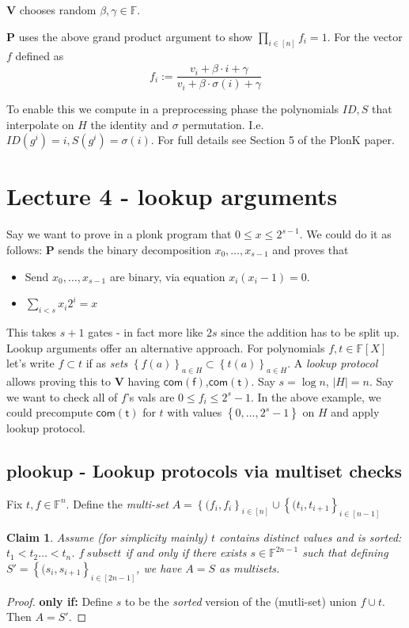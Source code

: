 \documentclass[11pt]{article} %
\newcommand{\F}{\ensuremath{\mathbb F}\xspace}
\newcommand{\com}[1]{\ensuremath{\mathsf{com(#1)}}\xspace}
\newcommand{\defeq}{:=}
\newcommand{\sett}[2]{\ensuremath{\set{#1}_{#2}}\xspace}
\newcommand{\prv}{\ensuremath{\mathsf{\mathbf{P}}}\xspace}
\newcommand{\ver}{\ensuremath{\mathsf{\mathbf{V}}}\xspace}
\newcommand{\set}[1]{\ensuremath{\left\{#1\right\}}\xspace}
\newcommand{\polys}{\ensuremath{\F[X]}\xspace}
\newtheorem{claim}[lemma]{Claim}
\begin{document}
\ver chooses random $\beta,\gamma\in \F$.

\prv uses the above grand product argument to show $\prod_{i\in [n]} f_i =1$.
For the vector $f$ defined as
\[f_i \defeq \frac{v_i + \beta \cdot i +\gamma}{v_i + \beta \cdot \sigma(i) +\gamma}\]

To enable this we compute in a preprocessing phase the polynomials $ID,S$ that interpolate on $H$ the identity and $\sigma$ permutation.
I.e. $ID(g^i)=i, S(g^i)=\sigma(i)$.
For full details see Section 5 of the PlonK paper.





\section{Lecture 4 - lookup arguments}
Say we want to prove in a plonk program
that $0\leq x \leq 2^{s-1}$.
We could do it as follows:
\prv sends the binary decomposition $x_0,\ldots,x_{s-1}$
and proves that
\begin{itemize}
 \item Send $x_0,\ldots,x_{s-1}$ are binary, via equation $x_i(x_i-1)=0$.
 \item $\sum_{i<s} x_i2^i =x$
\end{itemize}
This takes $s+1$ gates - in fact more like $2s$ since the addition has to be split up.
Lookup arguments offer an alternative approach.
For polynomials $f,t\in \polys$ let's write $f\subset t$ if as \emph{sets} $\sett{f(a)}{a\in H}\subset \sett{t(a)}{a\in H}$.
A \emph{lookup protocol} allows proving this to \ver having \com{f},\com{t}.
Say $s=\log n$, $|H|=n$. Say we want to check all of $f$'s vals are $0\leq f_i \leq 2^s-1$.
In the above example, we could precompute \com{t} for $t$ with values \set{0,\ldots,2^s-1} on $H$ 
and apply lookup protocol.

\subsection{plookup - Lookup protocols via multiset checks}
Fix $t,f\in \F^n$. Define the \emph{multi-set} 
$A=\set{(f_i,f_i}_{i\in [n]}\cup \sett{(t_i,t_{i+1}}{i \in [n-1]}$

\begin{claim}
Assume (for simplicity mainly) $t$ contains distinct values and is sorted: $t_1<t_2\ldots<t_n$.
 $f\ subset t$ if and only if there exists $s\in \F^{2n-1}$ such that 
defining $S'=\set{(s_i,s_{i+1}}_{i\in [2n-1]}$, 
we have $A=S$ as multisets.
\end{claim}
\begin{proof}
\textbf{only if:}
Define $s$ to be the \emph{sorted} version of the (mutli-set) union $f\cup t$.
Then $A=S'$.
\end{proof}
\end{document}
